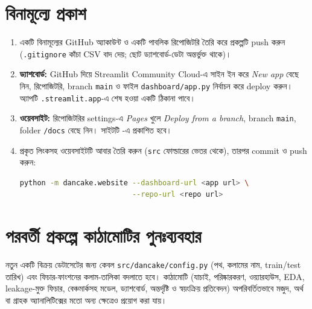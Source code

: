 \section{বিনামূল্যে প্রকাশ}
\begin{enumerate}
  \item একটি বিনামূল্যের GitHub অ্যাকাউন্ট ও একটি পাবলিক রিপোজিটরি তৈরি করে প্রকল্পটি push করুন (\texttt{.gitignore} কাঁচা CSV বাদ দেয়;
        ছোট ড্যাশবোর্ড-ডেটা অন্তর্ভুক্ত থাকে)।
  \item \textbf{ড্যাশবোর্ড:} GitHub দিয়ে Streamlit Community Cloud-এ সাইন ইন করে \emph{New app} বেছে নিন, রিপোজিটরি, branch
        \texttt{main} ও ফাইল \texttt{dashboard/app.py} নির্বাচন করে deploy করুন। অ্যাপটি \texttt{.streamlit.app}-এ শেষ হওয়া একটি ঠিকানা পাবে।
  \item \textbf{ওয়েবসাইট:} রিপোজিটরির settings-এ \emph{Pages} খুলে \emph{Deploy from a branch}, branch \texttt{main}, folder
        \texttt{/docs} বেছে নিন। সাইটটি -এ প্রকাশিত হবে।
  \item প্রকৃত লিংকসহ ওয়েবসাইটটি আবার তৈরি করুন (\texttt{src} ফোল্ডারের ভেতর থেকে), তারপর commit ও push করুন:
\begin{lstlisting}[language=bash]
python -m dancake.website --dashboard-url <app url> \
                          --repo-url <repo url>
\end{lstlisting}
\end{enumerate}

\section{পরবর্তী প্রকল্পে কাঠামোটির পুনঃব্যবহার}
নতুন একটি বিক্রয় ডেটাসেটের জন্য কেবল \texttt{src/dancake/config.py} (পথ, কলামের নাম, train/test তারিখ) এবং ফিচার-ফাংশনের কলাম-তালিকা
বদলাতে হবে। কাঠামোটি (যাচাই, পরিষ্কারকরণ, ওয়্যারহাউস, EDA, leakage-মুক্ত ফিচার, বেঞ্চমার্কসহ মডেল, ড্যাশবোর্ড, অন্তর্দৃষ্টি ও স্বয়ংক্রিয়
প্রতিবেদন) অপরিবর্তিতভাবে মজুদ, অর্থ বা গ্রাহক অ্যানালিটিক্সের মতো অন্য ক্ষেত্রেও প্রয়োগ করা যায়।
